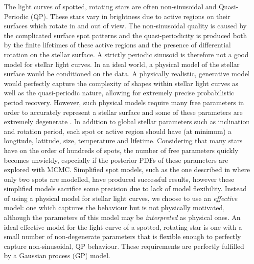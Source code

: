 The light curves of spotted, rotating stars are often non-sinusoidal and
Quasi-Periodic (QP).
These stars vary in brightness due to active regions on their surfaces which
rotate in and out of view.
The non-sinusoidal quality is caused by the complicated surface spot patterns
and the quasi-periodicity is produced both by the finite lifetimes of these
active regions and the presence of differential rotation on the stellar
surface.
A strictly periodic sinusoid is therefore not a good model for stellar light
curves.
In an ideal world, a physical model of the stellar surface would be
conditioned on the data.
A physically realistic, generative model would perfectly capture the complexity
of shapes within stellar light curves as well as the quasi-periodic nature,
allowing for extremely precise probabilistic period recovery.
However, such physical models require many free parameters in order to
accurately represent a stellar surface and some of these parameters are
extremely degenerate \citep[\eg][]{Russell1906, Jeffers2009}.
In addition to global stellar parameters such as inclination and rotation
period, each spot or active region should have (at minimum) a longitude,
latitude, size, temperature and lifetime.
Considering that many stars have on the order of hundreds of spots, the number
of free parameters quickly becomes unwieldy, especially if the posterior PDFs
of these parameters are explored with MCMC.
Simplified spot models, such as the one described in \citet{Lanza2014} where
only two spots are modelled, have produced successful results, however these
simplified models sacrifice some precision due to lack of model flexibility.
Instead of using a physical model for stellar light curves, we choose to use
an {\it effective} model: one which captures the behaviour but is not
physically motivated, although the parameters of this model may be {\it
interpreted} as physical ones.
An ideal effective model for the light curve of a spotted, rotating star is
one with a small number of non-degenerate parameters that is flexible enough
to perfectly capture non-sinusoidal, QP behaviour.
These requirements are perfectly fulfilled by a Gaussian process (GP) model.

